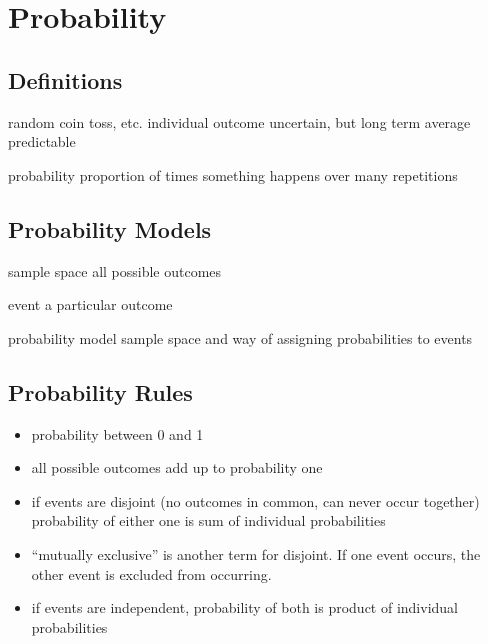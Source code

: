 \documentclass[landscape]{exam}
\begin{document}
  \section{Probability}

  \subsection{Definitions}

  \begin{description*}
    \item[random] coin toss, etc. individual outcome uncertain, but long term
      average predictable

    \item[probability] proportion of times something happens over many
      repetitions

  \end{description*}

  \subsection{Probability Models}

  \begin{description*}
    \item[sample space] all possible outcomes

    \item[event] a particular outcome

    \item[probability model] sample space and way of assigning probabilities to
      events

  \end{description*}

  \subsection{Probability Rules}

  \begin{itemize}
    \item probability between 0 and 1
    \item all possible outcomes add up to probability one
    \item if events are disjoint (no outcomes in common, can never occur
      together) probability of either one is sum of individual probabilities
    \item ``mutually exclusive'' is another term for disjoint. If one event
      occurs, the other event is excluded from occurring.
    \item if events are independent, probability of both is product of
      individual probabilities
  \end{itemize}
\end{document}
